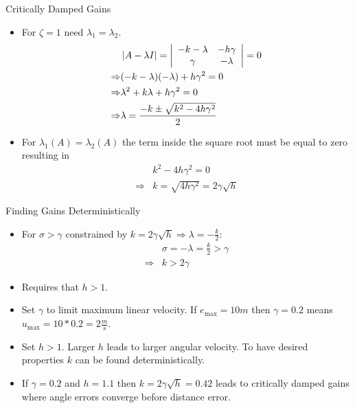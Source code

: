 \documentclass[hyperref={pdfpagelabels=false}]{beamer}
\begin{document}
\begin{frame}{Critically Damped Gains}
\begin{itemize}
\item For $\zeta=1$ need $\lambda_1=\lambda_2$.
\begin{align*}
&\left|A-\lambda I\right| = \left|\begin{array}{c c} -k-\lambda & -h\gamma \\ \gamma & -\lambda\end{array}\right| = 0 \\
\Rightarrow &(-k-\lambda)(-\lambda)+h\gamma^2 = 0 \\
\Rightarrow &\lambda^2 + k\lambda + h\gamma^2 = 0 \\
\Rightarrow &\lambda = \frac{-k\pm\sqrt{k^2-4h\gamma^2}}{2}
\end{align*}
\item For $\lambda_1(A)=\lambda_2(A)$ the term inside the square root must be equal to zero resulting in
\begin{align*}
&k^2 - 4h\gamma^2 = 0 \\
\Rightarrow &k = \sqrt{4h\gamma^2} = 2\gamma\sqrt{h}
\end{align*}
\end{itemize}
\end{frame}

\begin{frame}{Finding Gains Deterministically}
\begin{itemize}
\item For $\sigma>\gamma$ constrained by $k=2\gamma\sqrt{h} \Rightarrow \lambda=-\tfrac{k}{2}$:
\begin{align*}
&\sigma = -\lambda = \tfrac{k}{2} > \gamma \\
\Rightarrow &k > 2\gamma
\end{align*}
\item Requires that $h>1$.
\item Set $\gamma$ to limit maximum linear velocity. If $e_\text{max}=10m$ then $\gamma=0.2$ means $u_\text{max}=10*0.2=2\tfrac{m}{s}$.
\item Set $h>1$. Larger $h$ leads to larger angular velocity. To have desired properties $k$ can be found deterministically.
\item If $\gamma = 0.2$ and $h=1.1$ then $k=2\gamma\sqrt{h}=0.42$ leads to critically damped gains where angle errors converge before distance error.
\end{itemize}
\end{frame}
\end{document}
